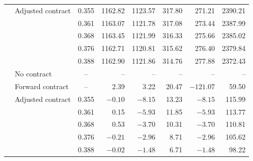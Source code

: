 \documentclass[12pt,a4paper]{article}
\begin{document}
\begin{table}[H]
{\begin{tabular}{llcrrrrr}
 & Adjusted contract & 0.355 & 1162.82 & 1123.57 & 317.80 & 271.21 & 2390.21 \\
 & & 0.361 & 1163.07 & 1121.78 & 317.08 & 273.44 & 2387.99 \\
 & & 0.368 & 1163.45 & 1121.99 & 316.33 & 275.66 & 2385.02 \\
 & & 0.376 & 1162.71 & 1120.81 & 315.62 & 276.40 & 2379.84 \\
 & & 0.388 & 1162.90 & 1121.86 & 314.76 & 277.88 & 2372.43 \\
\midrule
{} & No contract & -- & -- & -- & -- & -- & -- \\
 & Forward contract & -- & 2.39 & 3.22 & 20.47 & $-121.07$ & 59.50 \\
 & Adjusted contract & 0.355 & $-0.10$ & $-8.15$ & 13.23 & $-8.15$ & 115.99 \\
 & & 0.361 & 0.15 & $-5.93$ & 11.85 & $-5.93$ & 113.77 \\
 & & 0.368 & 0.53 & $-3.70$ & 10.31 & $-3.70$ & 110.81 \\
 & & 0.376 & $-0.21$ & $-2.96$ & 8.71 & $-2.96$ & 105.62 \\
 & & 0.388 & $-0.02$ & $-1.48$ & 6.71 & $-1.48$ & 98.22 \\
\bottomrule
\end{tabular}%
}
\end{table}
\end{document}
